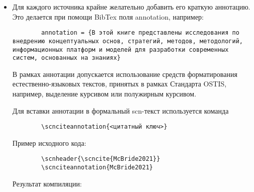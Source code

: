 \begin{itemize}
	\item Для каждого источника крайне желательно добавить его краткую аннотацию. Это делается при помощи BibTex поля annotation, например:
	
	\begin{verbatim}
		annotation = {В этой книге представлены исследования по внедрению концептуальных основ, стратегий, методов, методологий, информационных платформ и моделей для разработки современных систем, основанных на знаниях}
	\end{verbatim}
	
	В рамках аннотации допускается использование средств форматирования естественно-языковых текстов, принятых в рамках Стандарта OSTIS, например, выделение курсивом или полужирным курсивом.
	
	Для вставки аннотации в формальный scn-текст используется команда 
	
	\begin{verbatim}
		\scnciteannotation{<цитатный ключ>}
	\end{verbatim}
	
	Пример исходного кода:
	
	\begin{verbatim}
		\scnheader{\scncite{McBride2021}}
		\scnciteannotation{McBride2021}
	\end{verbatim}
	
	Результат компиляции:
	
	
\end{itemize}

\newpage
